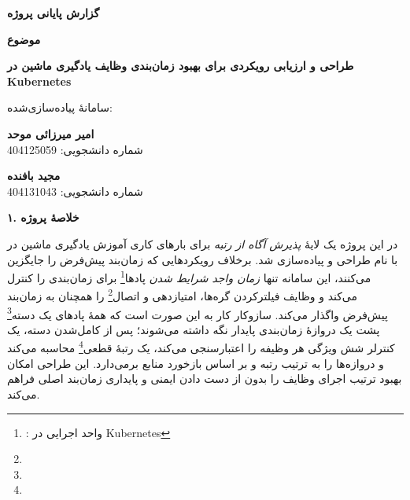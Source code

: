 \documentclass[a4paper,12pt]{article}
\begin{document}
	
	\begin{center}
		{\Large \textbf{گزارش پایانی پروژه}}
		
		\vspace{0.45cm}
		
		{\large \textbf{موضوع}}
		
		\vspace{0.2cm}
		
		\textbf{طراحی و ارزیابی رویکردی برای بهبود زمان‌بندی وظایف یادگیری ماشین در Kubernetes}
		
		\vspace{0.2cm}
		
		{\small سامانهٔ پیاده‌سازی‌شده: }
		
		\vspace{0.6cm}
		
		\begin{center}
			\begin{minipage}{0.42\textwidth}
				\centering
				\textbf{امیر میرزائی موحد}\\[0.15cm]
				شماره دانشجویی: 404125059
			\end{minipage}
			\hfill
			\begin{minipage}{0.42\textwidth}
				\centering
				\textbf{مجید بافنده}\\[0.15cm]
				شماره دانشجویی: 404131043
			\end{minipage}
		\end{center}
	\end{center}
	
	\vspace{0.35cm}
	
	{\large\textbf{۱. خلاصهٔ پروژه}}
	
	در این پروژه یک لایهٔ \emph{پذیرش آگاه از رتبه} برای بارهای کاری آموزش یادگیری ماشین در  با نام  طراحی و پیاده‌سازی شد. برخلاف رویکردهایی که زمان‌بند پیش‌فرض را جایگزین می‌کنند، این سامانه تنها \emph{زمان واجد شرایط ‌شدن} پادها\footnote{: واحد اجرایی در Kubernetes} برای زمان‌بندی را کنترل می‌کند و وظایف فیلترکردن گره‌ها، امتیازدهی و اتصال\footnote{} را همچنان به زمان‌بند پیش‌فرض واگذار می‌کند. سازوکار کار به این صورت است که همهٔ پادهای یک دسته\footnote{} پشت یک دروازهٔ زمان‌بندی پایدار نگه داشته می‌شوند؛ پس از کامل‌شدن دسته، یک کنترلر شش ویژگی هر وظیفه را اعتبارسنجی می‌کند، یک رتبهٔ قطعی\footnote{} محاسبه می‌کند و دروازه‌ها را به ترتیب رتبه و بر اساس بازخورد منابع برمی‌دارد. این طراحی امکان بهبود ترتیب اجرای وظایف را بدون از دست دادن ایمنی و پایداری زمان‌بند اصلی فراهم می‌کند.
	
\end{document}
